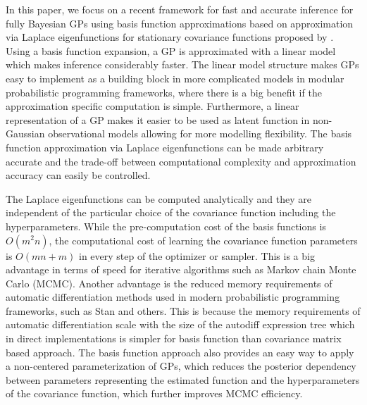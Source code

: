\documentclass[onecolumn,a4paper,11pt]{article}
\begin{document}
In this paper, we focus on a recent framework for fast and accurate inference for fully Bayesian GPs using basis function approximations based on approximation via Laplace eigenfunctions for stationary covariance functions proposed by \citet{solin2018hilbert}. Using a basis function expansion, a GP is approximated with a linear model which makes inference considerably faster. The linear model structure makes GPs easy to implement as a building block in more complicated models in modular probabilistic programming frameworks, where there is a big benefit if the approximation specific computation is simple. Furthermore, a linear representation of a GP makes it easier to be used as latent function in non-Gaussian observational models allowing for more modelling flexibility. The basis function approximation via Laplace eigenfunctions can be made arbitrary accurate and the trade-off between computational complexity and approximation accuracy can easily be controlled.

The Laplace eigenfunctions can be computed analytically and they are independent of the particular choice of the covariance function including the hyperparameters. While the pre-computation cost of the basis functions is $O(m^2n)$, the computational cost of learning the covariance function parameters is $O(mn+m)$ in every step of the optimizer or sampler. This is a big advantage in terms of speed for iterative algorithms such as Markov chain Monte Carlo (MCMC). Another advantage is the reduced memory requirements of automatic differentiation methods used in modern probabilistic programming frameworks, such as Stan \citep{carpenter2017stan} and others. This is because the memory requirements of automatic differentiation scale with the size of the autodiff expression tree which in direct implementations is simpler for basis function than covariance matrix based approach. The basis function approach also provides an easy way to apply a non-centered parameterization of GPs, which reduces the posterior dependency between parameters representing the estimated function and the hyperparameters of the covariance function, which further improves MCMC efficiency.

\end{document}

